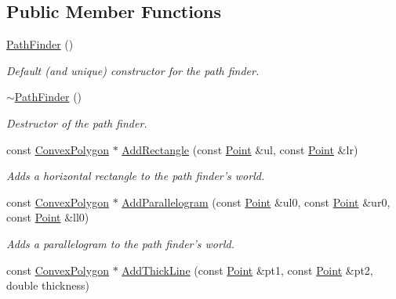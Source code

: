 \subsection*{Public Member Functions}
\begin{DoxyCompactItemize}
\item 
\hyperlink{classPathFinder_a0761f248c1ebaacf3e47a4021ca25256}{PathFinder} ()
\begin{DoxyCompactList}\small\item\em Default (and unique) constructor for the path finder. \item\end{DoxyCompactList}\item 
\hyperlink{classPathFinder_acc04bc8bcddfda54da6a2905b256cf90}{$\sim$PathFinder} ()
\begin{DoxyCompactList}\small\item\em Destructor of the path finder. \item\end{DoxyCompactList}\item 
const \hyperlink{structPathFinder_1_1ConvexPolygon}{ConvexPolygon} $\ast$ \hyperlink{classPathFinder_a7b703516042173b63c24759b600d655e}{AddRectangle} (const \hyperlink{structPathFinder_1_1Point}{Point} \&ul, const \hyperlink{structPathFinder_1_1Point}{Point} \&lr)
\begin{DoxyCompactList}\small\item\em Adds a horizontal rectangle to the path finder's world. \item\end{DoxyCompactList}\item 
const \hyperlink{structPathFinder_1_1ConvexPolygon}{ConvexPolygon} $\ast$ \hyperlink{classPathFinder_a85d6d0654ad55f798c4ecc826f7f63de}{AddParallelogram} (const \hyperlink{structPathFinder_1_1Point}{Point} \&ul0, const \hyperlink{structPathFinder_1_1Point}{Point} \&ur0, const \hyperlink{structPathFinder_1_1Point}{Point} \&ll0)
\begin{DoxyCompactList}\small\item\em Adds a parallelogram to the path finder's world. \item\end{DoxyCompactList}\item 
const \hyperlink{structPathFinder_1_1ConvexPolygon}{ConvexPolygon} $\ast$ \hyperlink{classPathFinder_a78778ee12c740256f30907e660c563b3}{AddThickLine} (const \hyperlink{structPathFinder_1_1Point}{Point} \&pt1, const \hyperlink{structPathFinder_1_1Point}{Point} \&pt2, double thickness)

\end{DoxyCompactItemize}
